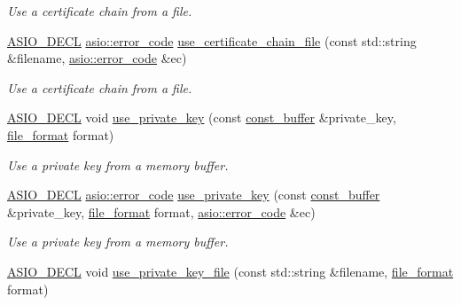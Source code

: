 \begin{DoxyCompactItemize}
\begin{DoxyCompactList}\small\item\em Use a certificate chain from a file. \end{DoxyCompactList}\item 
\hyperlink{config_8hpp_ab54d01ea04afeb9a8b39cfac467656b7}{A\+S\+I\+O\+\_\+\+D\+E\+C\+L} \hyperlink{classasio_1_1error__code}{asio\+::error\+\_\+code} \hyperlink{classasio_1_1ssl_1_1context_ac2b1bc5376304fd06372d7167b5928d8}{use\+\_\+certificate\+\_\+chain\+\_\+file} (const std\+::string \&filename, \hyperlink{classasio_1_1error__code}{asio\+::error\+\_\+code} \&ec)
\begin{DoxyCompactList}\small\item\em Use a certificate chain from a file. \end{DoxyCompactList}\item 
\hyperlink{config_8hpp_ab54d01ea04afeb9a8b39cfac467656b7}{A\+S\+I\+O\+\_\+\+D\+E\+C\+L} void \hyperlink{classasio_1_1ssl_1_1context_a160449396498ca3ee75c88a28892b725}{use\+\_\+private\+\_\+key} (const \hyperlink{classasio_1_1const__buffer}{const\+\_\+buffer} \&private\+\_\+key, \hyperlink{classasio_1_1ssl_1_1context__base_acc846aa73fffcab1fecad36dcf2be1fb}{file\+\_\+format} format)
\begin{DoxyCompactList}\small\item\em Use a private key from a memory buffer. \end{DoxyCompactList}\item 
\hyperlink{config_8hpp_ab54d01ea04afeb9a8b39cfac467656b7}{A\+S\+I\+O\+\_\+\+D\+E\+C\+L} \hyperlink{classasio_1_1error__code}{asio\+::error\+\_\+code} \hyperlink{classasio_1_1ssl_1_1context_ae726ca38dfe96b36e7c68f0d380a87d4}{use\+\_\+private\+\_\+key} (const \hyperlink{classasio_1_1const__buffer}{const\+\_\+buffer} \&private\+\_\+key, \hyperlink{classasio_1_1ssl_1_1context__base_acc846aa73fffcab1fecad36dcf2be1fb}{file\+\_\+format} format, \hyperlink{classasio_1_1error__code}{asio\+::error\+\_\+code} \&ec)
\begin{DoxyCompactList}\small\item\em Use a private key from a memory buffer. \end{DoxyCompactList}\item 
\hyperlink{config_8hpp_ab54d01ea04afeb9a8b39cfac467656b7}{A\+S\+I\+O\+\_\+\+D\+E\+C\+L} void \hyperlink{classasio_1_1ssl_1_1context_a615d6f42f1cd32213cea92ff030291e8}{use\+\_\+private\+\_\+key\+\_\+file} (const std\+::string \&filename, \hyperlink{classasio_1_1ssl_1_1context__base_acc846aa73fffcab1fecad36dcf2be1fb}{file\+\_\+format} format)

\end{DoxyCompactItemize}
